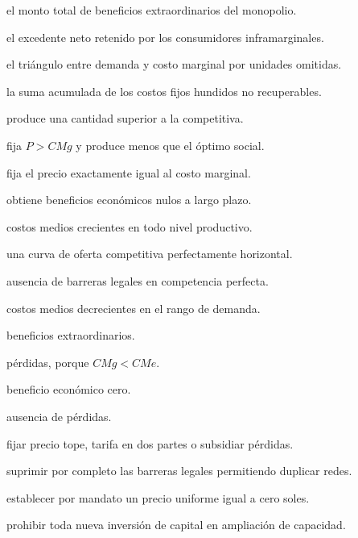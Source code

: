 \begin{opts}
    \item el monto total de beneficios extraordinarios del monopolio.
    \item el excedente neto retenido por los consumidores inframarginales.
    \item el triángulo entre demanda y costo marginal por unidades omitidas.
    \item la suma acumulada de los costos fijos hundidos no recuperables.
\end{opts}

\begin{opts}
    \item produce una cantidad superior a la competitiva.
    \item fija $P>CMg$ y produce menos que el óptimo social.
    \item fija el precio exactamente igual al costo marginal.
    \item obtiene beneficios económicos nulos a largo plazo.
\end{opts}

\begin{opts}
    \item costos medios crecientes en todo nivel productivo.
    \item una curva de oferta competitiva perfectamente horizontal.
    \item ausencia de barreras legales en competencia perfecta.
    \item costos medios decrecientes en el rango de demanda.
\end{opts}

\begin{opts}
    \item beneficios extraordinarios.
    \item pérdidas, porque $CMg<CMe$.
    \item beneficio económico cero.
    \item ausencia de pérdidas.
\end{opts}

\begin{opts}
    \item fijar precio tope, tarifa en dos partes o subsidiar pérdidas.
    \item suprimir por completo las barreras legales permitiendo duplicar redes.
    \item establecer por mandato un precio uniforme igual a cero soles.
    \item prohibir toda nueva inversión de capital en ampliación de capacidad.
\end{opts}

